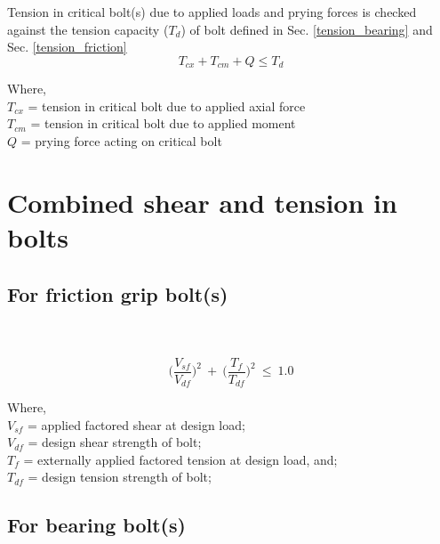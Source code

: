 \documentclass[11.5pt,a4paper,oneside]{report}
\begin{document}
\begin{Form}
Tension in critical bolt(s) due to applied loads and prying forces is checked against the tension capacity ($T_d$) of bolt defined in Sec. \ref{tension_bearing} and Sec. \ref{tension_friction} \\

\begin{equation}
	T_{cx} + T_{cm} + Q \le T_d
\end{equation}

Where, \\
\indent $T_{cx}$ = tension in critical bolt due to applied axial force \\
\indent $T_{cm}$ = tension in critical bolt due to applied moment \\
\indent $Q$ = prying force acting on critical bolt \\

\section{Combined shear and tension in bolts}
\subsection{For friction grip bolt(s)}
\qquad \qquad [Reference: Cl. 10.4.6, IS 800:2007] \\ \\

\begin{equation}
	\bigg(\frac{V_{sf}}{V_{df}}\bigg)^{2} ~ + ~ \bigg(\frac{T_{f}}{T_{df}}\bigg)^{2} ~ \leq ~ 1.0
\end{equation}

Where, \\
\indent $V_{sf}$ = applied factored shear at design load; \\
\indent $V_{df}$ = design shear strength of bolt; \\
\indent $T_f$ = externally applied factored tension at design load, and; \\
\indent $T_{df}$ = design tension strength of bolt; \\


\subsection{For bearing bolt(s)}
\qquad \qquad [Reference: Cl. 10.3.6, IS 800:2007] \\ \\


\end{Form}
\end{document}
